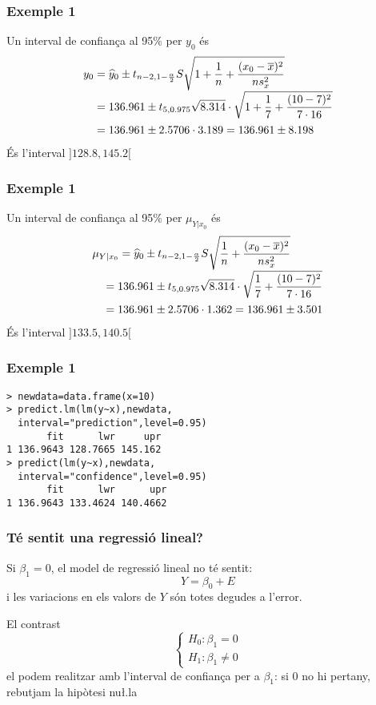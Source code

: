 \documentclass[12pt,t]{beamer}
\theoremstyle{plain}
\theoremstyle{definition}
\begin{document}
\begin{frame}
\frametitle{Exemple 1}
\vspace*{-2ex}


Un interval de confiança al 95\% per $y_0$ és
$$
\begin{array}{l}
\displaystyle
y_0=\widehat{y}_0\pm t_{n-2,1-\frac{\alpha}{2}} S\sqrt{1+\frac{1}{n}+\frac{(x_0-\overline{x})^2}{ns^2_x}}
\\[2ex]
\displaystyle\hphantom{y_0}=136.961\pm t_{5,0.975} \sqrt{8.314}\cdot\sqrt{1+\frac{1}{7}+\frac{(10-7)^2}{7\cdot 16 }}\\[2ex]
\hphantom{y_0} =
136.961\pm 2.5706 \cdot  3.189=136.961\pm  8.198
\end{array}
$$
És l'interval $]128.8,145.2[$

\end{frame}


\begin{frame}
\frametitle{Exemple 1}
\vspace*{-2ex}


Un interval de confiança al 95\% per $\mu_{Y|x_0}$ és
$$
\begin{array}{l}
\displaystyle
\mu_{Y|x_0}=\widehat{y}_0\pm t_{n-2,1-\frac{\alpha}{2}} S\sqrt{\frac{1}{n}+\frac{(x_0-\overline{x})^2}{ns^2_x}}
\\[2ex]
\displaystyle\hphantom{y_0}=136.961\pm t_{5,0.975} \sqrt{8.314}\cdot\sqrt{\frac{1}{7}+\frac{(10-7)^2}{7\cdot 16 }}\\[2ex]
\hphantom{y_0} =
136.961\pm 2.5706 \cdot  1.362=136.961\pm  3.501
\end{array}
$$
És l'interval $]133.5, 140.5[$

\end{frame}


\begin{frame}[fragile]
\frametitle{Exemple 1}
\vspace*{-2ex}

\begin{verbatim}
> newdata=data.frame(x=10)
> predict.lm(lm(y~x),newdata,
  interval="prediction",level=0.95)
       fit      lwr     upr
1 136.9643 128.7665 145.162
> predict(lm(y~x),newdata,
  interval="confidence",level=0.95)
       fit      lwr      upr
1 136.9643 133.4624 140.4662
\end{verbatim}



\end{frame}

\begin{frame}
\frametitle{Té sentit una regressió lineal?}

Si $\beta_1=0$,  el model de regressió lineal no té sentit:
$$
Y=\beta_0+E
$$
i les variacions en els valors de $Y$ són totes degudes a l'error.
\medskip

El contrast
$$
\left\{\begin{array}{l}
H_0:\beta_1=0\\
H_1:\beta_1 \neq 0
\end{array}
\right.
$$
el podem realitzar amb l'interval de confiança per a $\beta_1$: si 0 no hi pertany, 
rebutjam la hipòtesi nu\l.la
\end{frame}
\end{document}
